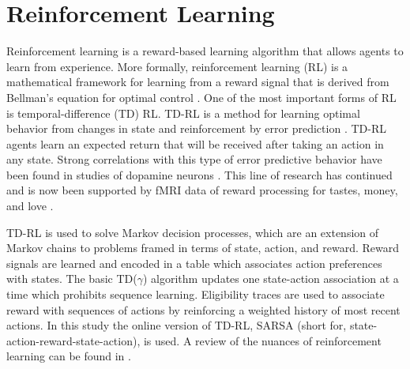\section{Reinforcement Learning}
Reinforcement learning is a reward-based learning algorithm that allows agents
to learn from experience. More formally, reinforcement
learning (RL) is a mathematical framework for learning from a reward signal that
is derived from Bellman's equation for optimal control \cite{sutton1998introduction}. One of
the most important forms of RL is temporal-difference (TD) RL. TD-RL is a method
for learning optimal behavior from changes in state and reinforcement by error
prediction \cite{sutton1988learning}. TD-RL agents learn an expected return that will be
received after taking an action in any state. Strong correlations with this type of
error predictive behavior have been found in studies of dopamine neurons
\cite{schultz1993responses}. This line of research has continued and is now been
supported by fMRI data of reward processing for tastes, money, and love
\cite{haber2009reward}.

TD-RL is used to solve Markov decision processes, which are an extension of
Markov chains to problems framed in terms of state, action, and reward. Reward signals are learned and encoded
in a table which associates action preferences with states. The basic
TD($\gamma$) algorithm updates one state-action association at a time which
prohibits sequence learning. Eligibility traces are used to associate reward
with sequences of actions by reinforcing a weighted history of most recent
actions. In this study the online version of TD-RL, SARSA (short for,
state-action-reward-state-action), is used. A review of the nuances of
reinforcement learning can be found in \cite{sutton1998introduction}.


